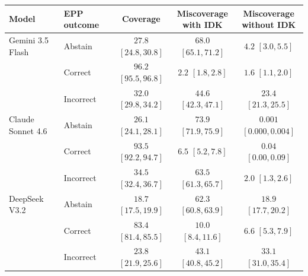 \begin{tabular}{@{}llccc@{}}
\toprule
Model & EPP outcome & Coverage & \shortstack{Miscoverage\\with IDK} & \shortstack{Miscoverage\\without IDK}\\
\midrule
Gemini 3.5 Flash & Abstain & $27.8$ $[24.8, 30.8]$ & $68.0$ $[65.1, 71.2]$ & $4.2$ $[3.0, 5.5]$\\
 & Correct & $96.2$ $[95.5, 96.8]$ & $2.2$ $[1.8, 2.8]$ & $1.6$ $[1.1, 2.0]$\\
 & Incorrect & $32.0$ $[29.8, 34.2]$ & $44.6$ $[42.3, 47.1]$ & $23.4$ $[21.3, 25.5]$\\
\midrule
Claude Sonnet 4.6 & Abstain & $26.1$ $[24.1, 28.1]$ & $73.9$ $[71.9, 75.9]$ & $0.001$ $[0.000, 0.004]$\\
 & Correct & $93.5$ $[92.2, 94.7]$ & $6.5$ $[5.2, 7.8]$ & $0.04$ $[0.00, 0.09]$\\
 & Incorrect & $34.5$ $[32.4, 36.7]$ & $63.5$ $[61.3, 65.7]$ & $2.0$ $[1.3, 2.6]$\\
\midrule
DeepSeek V3.2 & Abstain & $18.7$ $[17.5, 19.9]$ & $62.3$ $[60.8, 63.9]$ & $18.9$ $[17.7, 20.2]$\\
 & Correct & $83.4$ $[81.4, 85.5]$ & $10.0$ $[8.4, 11.6]$ & $6.6$ $[5.3, 7.9]$\\
 & Incorrect & $23.8$ $[21.9, 25.6]$ & $43.1$ $[40.8, 45.2]$ & $33.1$ $[31.0, 35.4]$\\
\bottomrule
\end{tabular}
